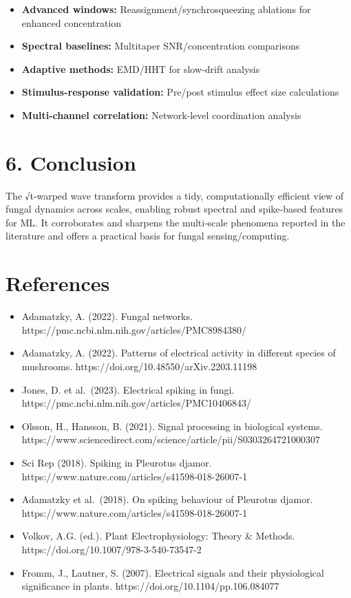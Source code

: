 \documentclass[
  11pt,
]{article}
\providecommand{\tightlist}{%
  \setlength{\itemsep}{0pt}\setlength{\parskip}{0pt}}
\begin{document}
\begin{itemize}
\tightlist
\item
  \textbf{Advanced windows:} Reassignment/synchrosqueezing ablations for
  enhanced concentration
\item
  \textbf{Spectral baselines:} Multitaper SNR/concentration comparisons
\item
  \textbf{Adaptive methods:} EMD/HHT for slow-drift analysis
\item
  \textbf{Stimulus-response validation:} Pre/post stimulus effect size
  calculations
\item
  \textbf{Multi-channel correlation:} Network-level coordination
  analysis
\end{itemize}

\hypertarget{conclusion}{%
\section{6. Conclusion}\label{conclusion}}

The √t‑warped wave transform provides a tidy, computationally efficient
view of fungal dynamics across scales, enabling robust spectral and
spike‑based features for ML. It corroborates and sharpens the
multi‑scale phenomena reported in the literature and offers a practical
basis for fungal sensing/computing.

\hypertarget{references}{%
\section{References}\label{references}}

\begin{itemize}
\tightlist
\item
  Adamatzky, A. (2022). Fungal networks.
  https://pmc.ncbi.nlm.nih.gov/articles/PMC8984380/
\item
  Adamatzky, A. (2022). Patterns of electrical activity in different
  species of mushrooms. https://doi.org/10.48550/arXiv.2203.11198
\item
  Jones, D. et al.~(2023). Electrical spiking in fungi.
  https://pmc.ncbi.nlm.nih.gov/articles/PMC10406843/
\item
  Olsson, H., Hansson, B. (2021). Signal processing in biological
  systems.
  https://www.sciencedirect.com/science/article/pii/S0303264721000307
\item
  Sci Rep (2018). Spiking in Pleurotus djamor.
  https://www.nature.com/articles/s41598-018-26007-1
\item
  Adamatzky et al.~(2018). On spiking behaviour of Pleurotus djamor.
  https://www.nature.com/articles/s41598-018-26007-1
\item
  Volkov, A.G. (ed.). Plant Electrophysiology: Theory \& Methods.
  https://doi.org/10.1007/978-3-540-73547-2
\item
  Fromm, J., Lautner, S. (2007). Electrical signals and their
  physiological significance in plants.
  https://doi.org/10.1104/pp.106.084077
\end{itemize}
\end{document}
